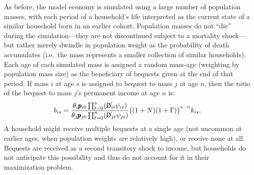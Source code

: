 \documentclass{econtex}\usepackage[pdftex]{graphicx}\usepackage{epstopdf} \usepackage[pdftex]{hyperref}
\newcommand{\kRat}{\ensuremath{k}}
\newcommand{\PDies}{\ensuremath{\mathsf{D}}}
\newcommand{\pLev}{\ensuremath{\pmb{p}}}
\newcommand{\PLives}{\ensuremath{\cancel{\PDies}}}
\newcommand{\pshk}{\psi} %
\begin{document}
As before, the model economy is simulated using a large number of population masses, with each period of a household's life interpreted as the current state of a similar household born in an earlier cohort.  Population masses do not ``die'' during the simulation---they are not discontinued subject to a mortality shock---but rather merely dwindle in population weight as the probability of death accumulates (i.e.\ the mass represents a smaller collection of similar households).  Each age of each simulated mass is assigned a random mass-age (weighting by population mass size) as the beneficiary of bequests given at the end of that period.  If mass $i$ at age $s$ is assigned to bequest to mass $j$ at age $n$, then the ratio of the bequest to mass $j$'s permanent income at age $n$ is:
\begin{equation}\label{eq:Bequest}
b_{is} = \frac{\theta_i \pLev_{i0} \prod_{t = 0}^s (\PLives_{it} \pshk_{it})}{\theta_j \pLev_{j0} \prod_{t = 0}^n (\PLives_{jt} \pshk_{jt})}\big((1 + N)(1 + \Gamma)\big)^{s - n} \kRat_{is}.
\end{equation}
A household might receive multiple bequests at a single age (not uncommon at earlier ages, when population weights are relatively high), or receive none at all.  Bequests are received as a second transitory shock to income, but households do not anticipate this possibility and thus do not account for it in their maximization problem.
\end{document}
